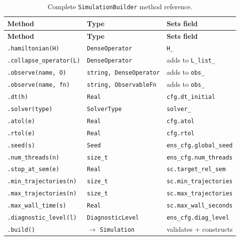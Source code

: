 \documentclass[11pt,a4paper,twoside]{book}
\newcommand{\code}[1]{\texttt{\small#1}}
\theoremstyle{definition}
\theoremstyle{remark}
\begin{document}
\begin{longtable}{L{42mm}L{28mm}L{38mm}}
\caption{Complete \code{SimulationBuilder} method reference.}
\label{tab:builder-ref}\\
\toprule
\textbf{Method} & \textbf{Type} & \textbf{Sets field} \\
\midrule
\endfirsthead
\midrule
\textbf{Method} & \textbf{Type} & \textbf{Sets field} \\
\midrule
\endhead
\bottomrule
\endfoot
\code{.hamiltonian(H)}       & \code{DenseOperator} & \code{H\_} \\
\code{.collapse\_operator(L)} & \code{DenseOperator} & adds to \code{L\_list\_} \\
\code{.observe(name, O)}     & \code{string, DenseOperator} & adds to \code{obs\_} \\
\code{.observe(name, fn)}    & \code{string, ObservableFn} & adds to \code{obs\_} \\
\code{.dt(h)}                & \code{Real} & \code{cfg.dt\_initial} \\
\code{.solver(type)}         & \code{SolverType} & \code{solver\_} \\
\code{.atol(e)}              & \code{Real} & \code{cfg.atol} \\
\code{.rtol(e)}              & \code{Real} & \code{cfg.rtol} \\
\code{.seed(s)}              & \code{Seed} & \code{ens\_cfg.global\_seed} \\
\code{.num\_threads(n)}      & \code{size\_t} & \code{ens\_cfg.num\_threads} \\
\code{.stop\_at\_sem(e)}     & \code{Real} & \code{sc.target\_rel\_sem} \\
\code{.min\_trajectories(n)} & \code{size\_t} & \code{sc.min\_trajectories} \\
\code{.max\_trajectories(n)} & \code{size\_t} & \code{sc.max\_trajectories} \\
\code{.max\_wall\_time(s)}   & \code{Real} & \code{sc.max\_wall\_seconds} \\
\code{.diagnostic\_level(l)} & \code{DiagnosticLevel} & \code{ens\_cfg.diag\_level} \\
\code{.build()}              & $\to$ \code{Simulation} & validates + constructs \\
\end{longtable}

\backmatter
\end{document}
